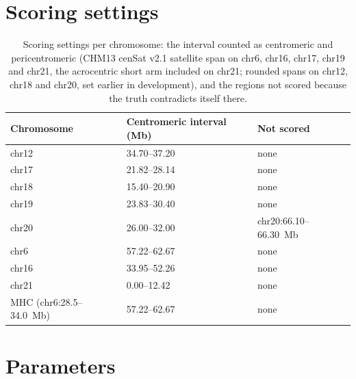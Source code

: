 \documentclass[10pt]{article}
\begin{document}
\section{Scoring settings}

\begin{table}[h]
\caption{Scoring settings per chromosome: the interval counted as centromeric and pericentromeric (CHM13 cenSat v2.1 satellite span on chr6, chr16, chr17, chr19 and chr21, the acrocentric short arm included on chr21; rounded spans on chr12, chr18 and chr20, set earlier in development), and the regions not scored because the truth contradicts itself there.}\label{tab:scoring}
\centering\footnotesize
\setlength{\tabcolsep}{4pt}
\begin{tabular}{@{}lll@{}}
\toprule
Chromosome & Centromeric interval (Mb) & Not scored \\
\midrule
chr12 & 34.70--37.20 & none \\
chr17 & 21.82--28.14 & none \\
chr18 & 15.40--20.90 & none \\
chr19 & 23.83--30.40 & none \\
chr20 & 26.00--32.00 & chr20:66.10--66.30~Mb \\
chr6 & 57.22--62.67 & none \\
chr16 & 33.95--52.26 & none \\
chr21 & 0.00--12.42 & none \\
MHC (chr6:28.5--34.0~Mb) & 57.22--62.67 & none \\
\bottomrule
\end{tabular}
\end{table}

\section{Parameters}
\end{document}
